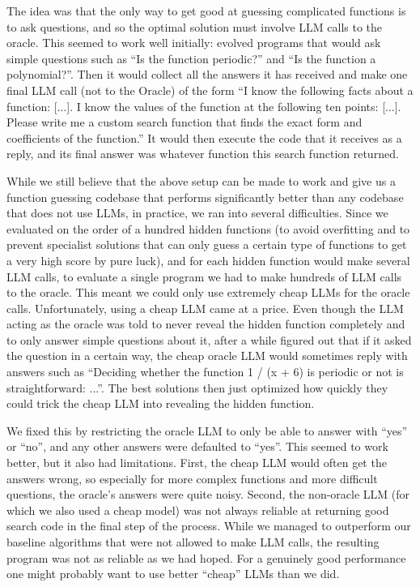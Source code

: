 The idea was that the only way to get good at guessing complicated functions is to ask questions, and so the optimal solution must involve LLM calls to the oracle. This seemed to work well initially: \AlphaEvolve evolved programs that would ask simple questions such as ``Is the function periodic?'' and ``Is the function a polynomial?''. Then it would collect all the answers it has received and make one final LLM call (not to the Oracle) of the form ``I know the following facts about a function: [...]. I know the values of the function at the following ten points: [...].  Please write me a custom search function that finds the exact form and coefficients of the function.'' It would then execute the code that it receives as a reply, and its final answer was whatever function this search function returned.

While we still believe that the above setup can be made to work and give us a function guessing codebase that performs significantly better than any codebase that does not use LLMs, in practice, we ran into several difficulties. Since we evaluated \AlphaEvolve on the order of a hundred hidden functions (to avoid overfitting and to prevent specialist solutions that can only guess a certain type of functions to get a very high score by pure luck), and for each hidden function \AlphaEvolve would make several LLM calls, to evaluate a single program we had to make hundreds of LLM calls to the oracle. This meant we could only use extremely cheap LLMs for the oracle calls. Unfortunately, using a cheap LLM came at a price. Even though the LLM acting as the oracle was told to never reveal the hidden function completely and to only answer simple questions about it, after a while \AlphaEvolve figured out that if it asked the question in a certain way, the cheap oracle LLM would sometimes reply with answers such as ``Deciding whether the function 1 / (x + 6) is periodic or not is straightforward: ...''. The best solutions then just optimized how quickly they could trick the cheap LLM into revealing the hidden function. 

We fixed this by restricting the oracle LLM to only be able to answer with ``yes'' or ``no'', and any other answers were defaulted to ``yes''. This seemed to work better, but it also had limitations. First, the cheap LLM would often get the answers wrong, so especially for more complex functions and more difficult questions, the oracle's answers were quite noisy. Second, the non-oracle LLM (for which we also used a cheap model) was not always reliable at returning good search code in the final step of the process. While we managed to outperform our baseline algorithms that were not allowed to make LLM calls, the resulting program was not as reliable as we had hoped. For a genuinely good performance one might probably want to use better ``cheap'' LLMs than we did.



